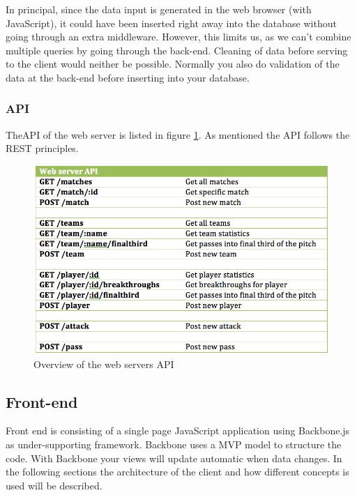 In principal, since the data input is generated in the web browser (with JavaScript), it could have been inserted right away into the database without going through an extra middleware. However, this limits us, as we can’t combine multiple queries by going through the back-end. Cleaning of data before serving to the client would neither be possible. Normally you also do validation of the data at the back-end before inserting into your database.

\subsubsection{API}

The\ac{API} of the web server is listed in figure \ref{fig:api}. As mentioned the \ac{API} follows the \ac{REST} principles. 

\begin{figure}[ht!]
\centering
\includegraphics[width=1\textwidth]{images/implementation/API.png}
\caption{Overview of the web servers API}
\label{fig:api}
\end{figure}

\subsection{Front-end}

Front end is consisting of a single page JavaScript application using Backbone.js \footnotemark as under-supporting framework. Backbone uses a \ac{MVP} model to structure the code. With Backbone your views will update automatic when data changes. In the following sections the architecture of the client and how different concepts is used will be described. 


